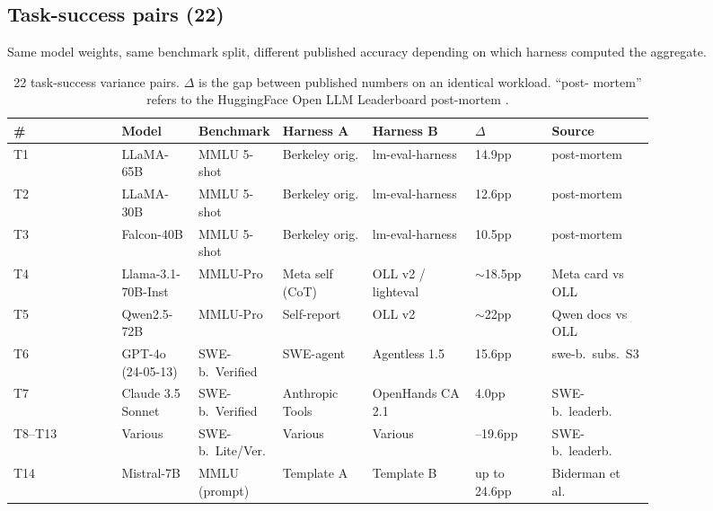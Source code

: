 \documentclass{article}
\begin{document}
\subsection{Task-success pairs (22)}
\label{app:vc:task}

Same model weights, same benchmark split, different published
accuracy depending on which harness computed the aggregate.

\begin{table}[h]
\centering
\footnotesize
\setlength{\tabcolsep}{3pt}
\caption{22 task-success variance pairs. $\Delta$ is the gap
between published numbers on an identical workload. ``post-%
mortem'' refers to the HuggingFace Open LLM Leaderboard
post-mortem \citep{beeching2023openllm}.}
\label{tab:vc:task}
\begin{tabular}{@{}l>{\raggedright\arraybackslash}p{0.12\linewidth}>{\raggedright\arraybackslash}p{0.13\linewidth}>{\raggedright\arraybackslash}p{0.14\linewidth}>{\raggedright\arraybackslash}p{0.16\linewidth}>{\raggedright\arraybackslash}p{0.12\linewidth}>{\raggedright\arraybackslash}p{0.16\linewidth}@{}}
\toprule
\textbf{\#} & \textbf{Model} & \textbf{Benchmark} &
\textbf{Harness A} & \textbf{Harness B} &
\textbf{$\Delta$} & \textbf{Source} \\
\midrule
T1  & LLaMA-65B         & MMLU 5-shot   & Berkeley orig.       & lm-eval-harness    & 14.9pp         & post-mortem \\
T2  & LLaMA-30B         & MMLU 5-shot   & Berkeley orig.       & lm-eval-harness    & 12.6pp         & post-mortem \\
T3  & Falcon-40B        & MMLU 5-shot   & Berkeley orig.       & lm-eval-harness    & 10.5pp         & post-mortem \\
T4  & Llama-3.1-70B-Inst & MMLU-Pro     & Meta self (CoT)      & OLL v2 / lighteval & $\sim$18.5pp   & Meta card vs OLL \\
T5  & Qwen2.5-72B       & MMLU-Pro      & Self-report          & OLL v2             & $\sim$22pp     & Qwen docs vs OLL \\
T6  & GPT-4o (24-05-13) & SWE-b.\ Verified & SWE-agent         & Agentless 1.5      & 15.6pp         & swe-b.\ subs.\ S3 \\
T7  & Claude 3.5 Sonnet & SWE-b.\ Verified & Anthropic Tools   & OpenHands CA 2.1   & 4.0pp          & SWE-b.\ leaderb. \\
T8--T13 & Various       & SWE-b.\ Lite/Ver. & Various          & Various            & 3.4--19.6pp   & SWE-b.\ leaderb. \\
T14 & Mistral-7B        & MMLU (prompt) & Template A           & Template B         & up to 24.6pp   & Biderman et al.\ \\

\end{tabular}
\end{table}
\end{document}
